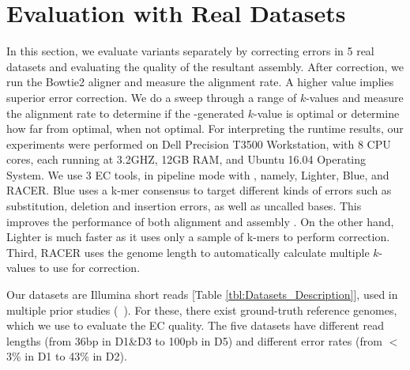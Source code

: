 \vspace{-5pt}
\section{Evaluation with Real Datasets}
\label{sec:evaluation-real}

In this section, we evaluate \name variants separately by correcting errors in 5 real datasets and evaluating the quality of the resultant assembly. After correction, we run the Bowtie2 aligner \cite{langmead2012fast} and measure the alignment rate. A higher value implies superior error correction. We do a sweep through a range of $k$-values and measure the alignment rate to determine if the \name-generated $k$-value is optimal or determine how far from optimal, when not optimal. For interpreting the runtime results, our experiments were performed on Dell Precision T3500 Workstation, with 8 CPU cores, each running at 3.2GHZ, 12GB RAM, and Ubuntu 16.04 Operating System.
We use 3 EC tools, in pipeline mode with \name, namely, Lighter, Blue, and RACER. Blue uses a k-mer consensus to target different kinds of errors such as substitution, deletion and insertion errors, as well as uncalled bases. This improves the performance of both alignment and assembly \cite{greenfield2014blue}. On the other hand, Lighter is much faster as it uses only a sample of k-mers to perform correction. %
Third, RACER uses the genome length to automatically calculate multiple $k$-values to use for correction.

Our datasets are Illumina short reads [Table \ref{tbl:Datasets_Description}], used in multiple prior studies (\eg~\cite{yang2010reptile, doi:10.1093/bioinformatics/btp379}). For these, there exist ground-truth reference genomes, which we use to evaluate the EC quality. %
The five datasets have different read lengths (from 36bp in D1\&D3 to 100pb in D5) and different error rates (from $<$ 3\% in D1 to 43\% in D2).  

